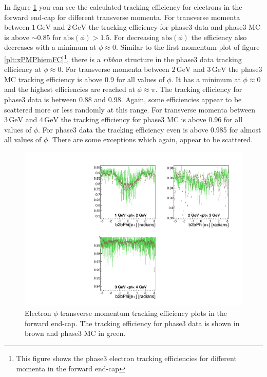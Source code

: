 \documentclass[a4paper,11pt,twosided,final,german,openbib,pdftex,listof=totoc,bibliography=totoc]{scrbook}
\begin{document}
In figure \ref{plt:xPtMPhiemFC3} you can see the calculated tracking efficiency for electrons in the forward end-cap for different transverse momenta. 
For transverse momenta between $1\,\textrm{GeV}$ and $2\,\textrm{GeV}$ the tracking efficiency for phase3 data and phase3 MC is above $\sim 0.85$ for $\textrm{abs}(\phi) >1.5$. For decreasing $\textrm{abs}(\phi)$ the efficiency also decreases with a minimum at $\phi \approx 0$. Similar to the first momentum plot of figure \ref{plt:xPMPhiemFC}\footnote{This figure shows the phase3 electron tracking efficiencies for different momenta in the forward end-cap}, there is a \textit{ribbon} structure in the phase3 data tracking efficiency at $\phi \approx 0$.
For transverse momenta between $2\,\textrm{GeV}$ and $3\,\textrm{GeV}$ the phase3 MC tracking efficiency is above 0.9 for all values of $\phi$. It has a minimum at $\phi \approx 0$ and the highest efficiencies are reached at $\phi \approx \pi$. The tracking efficiency for phase3 data is between 0.88 and 0.98. Again, some efficiencies appear to be scattered more or less randomly at this range. 
For transverse momenta between $3\,\textrm{GeV}$ and $4\,\textrm{GeV}$ the tracking efficiency for phase3 MC is above 0.96 for all values of $\phi$. For phase3 data the tracking efficiency even is above 0.985 for almost all values of $\phi$. There are some exceptions which again, appear to be scattered.


\begin{figure}[!htbp]
	\centering
	\includegraphics[width=\textwidth]{Plots/master3/xPtMPhiemFCP3}
	\caption[Transverse Momentum $\phi$ Electron Forward End-Cap Efficiency Phase3]{Electron $\phi$ transverse momentum tracking efficiency plots in the forward end-cap. The tracking efficiency for phase3 data is shown in brown and phase3 MC in green.}
	\label{plt:xPtMPhiemFC3}
\end{figure}
\end{document}
